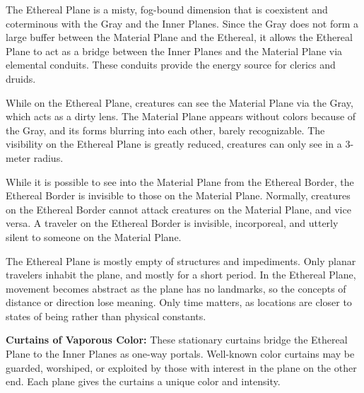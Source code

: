 The Ethereal Plane is a misty, fog-bound dimension that is coexistent and coterminous with the Gray and the Inner Planes. Since the Gray does not form a large buffer between the Material Plane and the Ethereal, it allows the Ethereal Plane to act as a bridge between the Inner Planes and the Material Plane via elemental conduits. These conduits provide the energy source for clerics and druids.

While on the Ethereal Plane, creatures can see the Material Plane via the Gray, which acts as a dirty lens. The Material Plane appears without colors because of the Gray, and its forms blurring into each other, barely recognizable. The visibility on the Ethereal Plane is greatly reduced, creatures can only see in a 3-meter radius.

While it is possible to see into the Material Plane from the Ethereal Border, the Ethereal Border is invisible to those on the Material Plane. Normally, creatures on the Ethereal Border cannot attack creatures on the Material Plane, and vice versa. A traveler on the Ethereal Border is invisible, incorporeal, and utterly silent to someone on the Material Plane.

The Ethereal Plane is mostly empty of structures and impediments. Only planar travelers inhabit the plane, and mostly for a short period.
In the Ethereal Plane, movement becomes abstract as the plane has no landmarks, so the concepts of distance or direction lose meaning. Only time matters, as locations are closer to states of being rather than physical constants.


\textbf{Curtains of Vaporous Color:} These stationary curtains bridge the Ethereal Plane to the Inner Planes as one-way portals. Well-known color curtains may be guarded, worshiped, or exploited by those with interest in the plane on the other end. Each plane gives the curtains a unique color and intensity.


